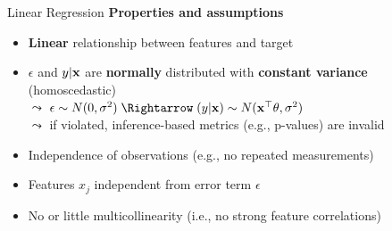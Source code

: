 \documentclass[10pt,compress,t,notes=noshow, xcolor=table]{beamer}
\begin{document}
\begin{frame}[c]{Linear Regression}
   \vspace*{0.2cm} 
   \pause
    \textbf{Properties and assumptions}  %
    \begin{itemize}[<+->]
    \item \textbf{Linear} relationship between features and target
    \item $\epsilon$ and $y \vert \mathbf{x}$ are \textbf{normally} distributed with \textbf{constant variance} (homoscedastic)\\
    $\leadsto$ $\epsilon \sim N(0, \sigma^2) \; \Rightarrow \; (y \vert \xv) \sim N(\xv^\top \theta, \sigma^2)$\\
    $\leadsto$ if violated, inference-based metrics (e.g., p-values) are invalid
    \item Independence of observations (e.g., no repeated measurements) %
    \item Features $x_j$ independent from error term $\epsilon$
    \item No or little multicollinearity (i.e., no strong feature correlations)
    \end{itemize}

\end{frame}
\end{document}
